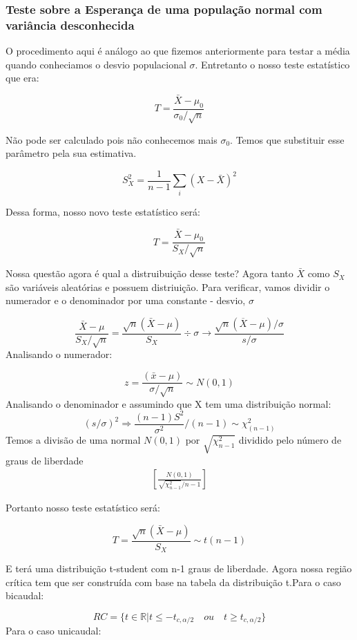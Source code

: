 \documentclass[
  letterpaper,
  DIV=11,
  numbers=noendperiod]{scrartcl}
\begin{document}
\subsubsection{Teste sobre a Esperança de uma população normal com
variância
desconhecida}\label{teste-sobre-a-esperanuxe7a-de-uma-populauxe7uxe3o-normal-com-variuxe2ncia-desconhecida}

O procedimento aqui é análogo ao que fizemos anteriormente para testar a
média quando conheciamos o desvio populacional \(\sigma\). Entretanto o
nosso teste estatístico que era:

\[T=\frac{\bar{X}-\mu_0}{\sigma_0/\sqrt{n}}\]

Não pode ser calculado pois não conhecemos mais \(\sigma_0\). Temos que
substituir esse parâmetro pela sua estimativa.

\[S_X^2=\frac{1}{n-1}\sum_i (X-\bar{X})^2\]

Dessa forma, nosso novo teste estatístico será:

\[T=\frac{\bar{X}-\mu_0}{S_X/\sqrt{n}}\]

Nossa questão agora é qual a distruibuição desse teste? Agora tanto
\(\bar{X}\) como \(S_X\) são variáveis aleatórias e possuem distriuição.
Para verificar, vamos dividir o numerador e o denominador por uma
constante - desvio, \(\sigma\)

\[\frac{\bar{X}-\mu}{S_X / \sqrt{n}} = \frac{\sqrt{n}(\bar{X}-\mu)}{S_X} \div \sigma \rightarrow \frac{\sqrt{n}(\overline{X}-\mu) / \sigma}{s / \sigma}\]
Analisando o numerador:

\[z=\frac{(\bar{x}-\mu)}{\sigma / \sqrt{n}} \sim N(0,1)\] Analisando o
denominador e assumindo que X tem uma distribuição normal:
\[(s/ \sigma)^{2} \Rightarrow \frac{(n-1) S^{2}}{\sigma^{2}} /(n-1) \sim \chi^{2}_{(n-1)}\]
Temos a divisão de uma normal \(N(0,1)\) por \(\sqrt{\chi^2_{n-1}}\)
dividido pelo número de graus de liberdade \[\begin{array}{ccc}
\left[\frac{N(0,1)}{\sqrt{\chi^{2}_{n-1}}/ n-1}\right] 
\end{array}\]

Portanto nosso teste estatístico será:

\[T=\frac{\sqrt{n}(\bar{X}-\mu)}{S_X} \sim t(n-1)\]

E terá uma distribuição t-student com n-1 graus de liberdade. Agora
nossa região crítica tem que ser construída com base na tabela da
distribuição t.Para o caso bicaudal:

\[RC=\{t \in \mathbb{R} |t\leq - t_{c,\alpha/2} \quad ou \quad t\geq  t_{c,\alpha/2}\}\]
Para o caso unicaudal:
\end{document}
